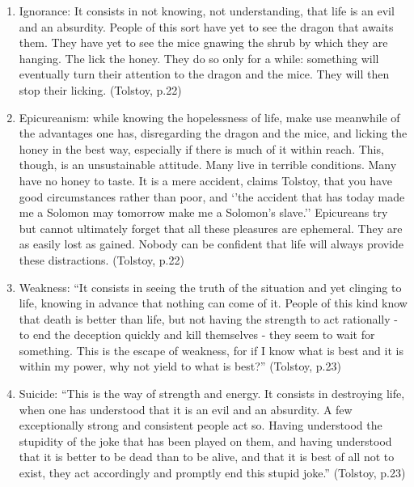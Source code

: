 \documentclass[10pt]{article}
\begin{document}
\begin{enumerate}
\def\labelenumi{\arabic{enumi}.}
\item
  Ignorance: It consists in not knowing, not understanding, that life is
  an evil and an absurdity. People of this sort have yet to see the
  dragon that awaits them. They have yet to see the mice gnawing the
  shrub by which they are hanging. The lick the honey. They do so only
  for a while: something will eventually turn their attention to the
  dragon and the mice. They will then stop their licking. (Tolstoy,
  p.22)
\item
  Epicureanism: while knowing the hopelessness of life, make use
  meanwhile of the advantages one has, disregarding the dragon and the
  mice, and licking the honey in the best way, especially if there is
  much of it within reach. This, though, is an unsustainable attitude.
  Many live in terrible conditions. Many have no honey to taste. It is a
  mere accident, claims Tolstoy, that you have good circumstances rather
  than poor, and `'the accident that has today made me a Solomon may
  tomorrow make me a Solomon's slave.'' Epicureans try but cannot
  ultimately forget that all these pleasures are ephemeral. They are as
  easily lost as gained. Nobody can be confident that life will always
  provide these distractions. (Tolstoy, p.22)
\item
  Weakness: ``It consists in seeing the truth of the situation and yet
  clinging to life, knowing in advance that nothing can come of it.
  People of this kind know that death is better than life, but not
  having the strength to act rationally - to end the deception quickly
  and kill themselves - they seem to wait for something. This is the
  escape of weakness, for if I know what is best and it is within my
  power, why not yield to what is best?'' (Tolstoy, p.23)
\item
  Suicide: ``This is the way of strength and energy. It consists in
  destroying life, when one has understood that it is an evil and an
  absurdity. A few exceptionally strong and consistent people act so.
  Having understood the stupidity of the joke that has been played on
  them, and having understood that it is better to be dead than to be
  alive, and that it is best of all not to exist, they act accordingly
  and promptly end this stupid joke.'' (Tolstoy, p.23)
\end{enumerate}
\end{document}
